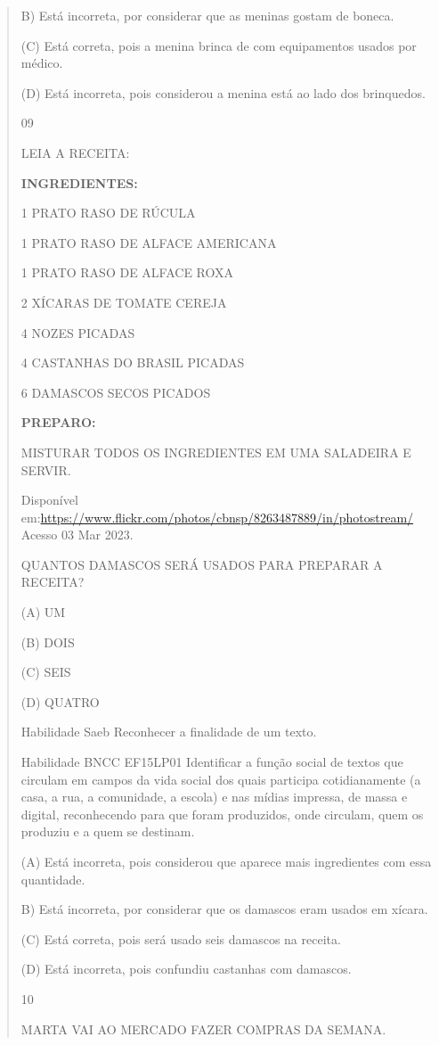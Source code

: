 \begin{verse}
{{{{{{{{{{{{{{{{{{{{B) Está incorreta, por considerar que as meninas gostam de boneca.

(C) Está correta, pois a menina brinca de com equipamentos usados por
médico.

(D) Está incorreta, pois considerou a menina está ao lado dos
brinquedos.

\num{09}

LEIA A RECEITA:

\textbf{INGREDIENTES:}

1 PRATO RASO DE RÚCULA

1 PRATO RASO DE ALFACE AMERICANA

1 PRATO RASO DE ALFACE ROXA

2 XÍCARAS DE TOMATE CEREJA

4 NOZES PICADAS

4 CASTANHAS DO BRASIL PICADAS

6 DAMASCOS SECOS PICADOS

\textbf{PREPARO:}

MISTURAR TODOS OS INGREDIENTES EM UMA SALADEIRA E SERVIR.

Disponível
em:\url{https://www.flickr.com/photos/cbnsp/8263487889/in/photostream/}
Acesso 03 Mar 2023.

QUANTOS DAMASCOS SERÁ USADOS PARA PREPARAR A RECEITA?

(A) UM

(B) DOIS

(C) SEIS

(D) QUATRO

Habilidade Saeb Reconhecer a finalidade de um texto.

Habilidade BNCC EF15LP01 Identificar a função social de textos que
circulam em campos da vida social dos quais participa cotidianamente (a
casa, a rua, a comunidade, a escola) e nas mídias impressa, de massa e
digital, reconhecendo para que foram produzidos, onde circulam, quem os
produziu e a quem se destinam.

(A) Está incorreta, pois considerou que aparece mais ingredientes com
essa quantidade.

B) Está incorreta, por considerar que os damascos eram usados em xícara.

(C) Está correta, pois será usado seis damascos na receita.

(D) Está incorreta, pois confundiu castanhas com damascos.

\num{10}

MARTA VAI AO MERCADO FAZER COMPRAS DA SEMANA.

}}}}}}}}}}}}}}}}}}}}
\end{verse}
